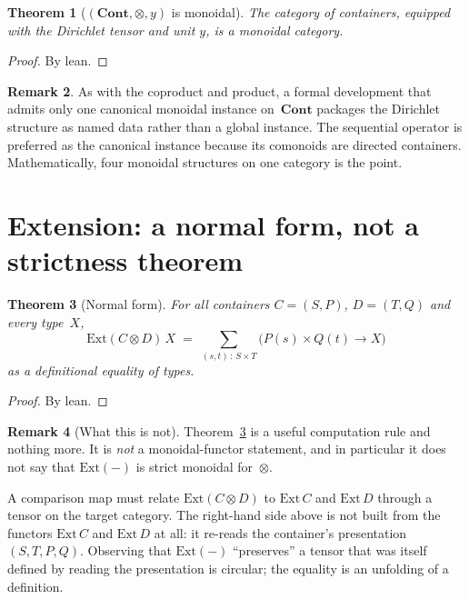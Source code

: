 \documentclass[11pt,a4paper]{article}
\theoremstyle{plain}
\newtheorem{theorem}{Theorem}[section]
\theoremstyle{definition}
\newtheorem{remark}[theorem]{Remark}
\newcommand{\Cont}{\mathbf{Cont}}
\newcommand{\Ext}{\mathrm{Ext}}
\newcommand{\Dir}{\mathbin{\otimes}}
\begin{document}
\begin{theorem}[$(\Cont, \Dir, y)$ is monoidal]\label{thm:dir-monoidal}
The category of containers, equipped with the Dirichlet tensor and unit
$y$, is a monoidal category.
\end{theorem}

\begin{proof}
By lean.
\end{proof}

\begin{remark}
As with the coproduct and product, a formal development that admits only
one canonical monoidal instance on~$\Cont$ packages the Dirichlet
structure as named data rather than a global instance. The sequential
operator is preferred as the canonical instance because its comonoids are
directed containers. Mathematically, four monoidal structures on one
category is the point.
\end{remark}

\section{Extension: a normal form, not a strictness theorem}

\begin{theorem}[Normal form]\label{thm:normal-form}
For all containers $C = (S,P)$, $D = (T,Q)$ and every type~$X$,
\begin{equation}
  \Ext(C \Dir D)\,X
  \;=\;
  \sum_{(s,t) \,:\, S \times T}
  \bigl(P(s) \times Q(t) \to X\bigr)
\end{equation}
as a definitional equality of types.
\end{theorem}

\begin{proof}
By lean.
\end{proof}

\begin{remark}[What this is not]
Theorem~\ref{thm:normal-form} is a useful computation rule and nothing
more. It is \emph{not} a monoidal-functor statement, and in particular it
does not say that $\Ext(-)$ is strict monoidal for~$\Dir$.

A comparison map must relate $\Ext(C \Dir D)$ to $\Ext\,C$ and $\Ext\,D$
through a tensor on the target category. The right-hand side above is not
built from the functors $\Ext\,C$ and $\Ext\,D$ at all: it re-reads the
container's presentation $(S,T,P,Q)$. Observing that $\Ext(-)$ ``preserves''
a tensor that was itself defined by reading the presentation is circular;
the equality is an unfolding of a definition.
\end{remark}
\end{document}
